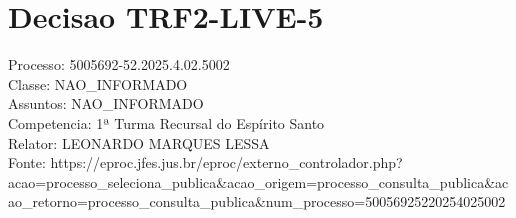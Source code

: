 \documentclass[12pt]{article}
\begin{document}
\section*{Decisao TRF2-LIVE-5}
Processo: 5005692-52.2025.4.02.5002\\
Classe: NAO\_INFORMADO\\
Assuntos: NAO\_INFORMADO\\
Competencia: 1ª Turma Recursal do Espírito Santo\\
Relator: LEONARDO MARQUES LESSA\\
Fonte: https://eproc.jfes.jus.br/eproc/externo\_controlador.php?acao=processo\_seleciona\_publica\&acao\_origem=processo\_consulta\_publica\&acao\_retorno=processo\_consulta\_publica\&num\_processo=50056925220254025002
\end{document}
